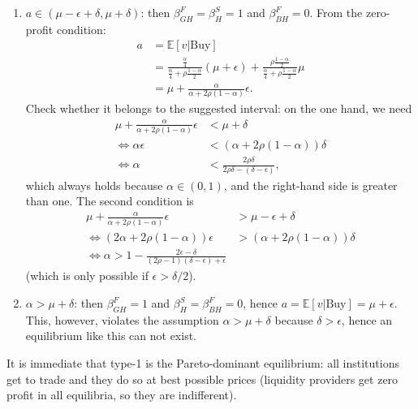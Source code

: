 \begin{solution}
\begin{enumerate}
		\item $a \in (\mu - \epsilon + \delta, \mu + \delta)$: then $\beta^F_{GH} = \beta^S_H = 1$ and $\beta^F_{BH} = 0$. From the zero-profit condition:
		\begin{align*}
			a &= \mathbb{E}[v | \text{Buy}]
			\\
			&= \frac{\frac{\alpha}{4}}{\frac{\alpha}{4} + \rho \frac{1-\alpha}{2}} (\mu + \epsilon) 
			+ \frac{\rho \frac{1-\alpha}{2}}{\frac{\alpha}{4} + \rho \frac{1-\alpha}{2}} \mu
			\\
			&= \mu + \frac{\alpha}{\alpha + 2\rho (1-\alpha)} \epsilon.
		\end{align*}
		Check whether it belongs to the suggested interval: on the one hand, we need
		\begin{align*}
			\mu + \frac{\alpha}{\alpha + 2\rho (1-\alpha)} \epsilon &< \mu + \delta
			\\
			\iff
			\alpha \epsilon &< \left( \alpha + 2\rho (1-\alpha) \right) \delta
			\\
			\iff
			\alpha &< \frac{2\rho \delta}{2\rho \delta - (\delta - \epsilon)},
		\end{align*}
		which always holds because $\alpha \in (0,1)$, and the right-hand side is greater than one. The second condition is
		\begin{align*}
			\mu + \frac{\alpha}{\alpha + 2\rho (1-\alpha)} \epsilon &> \mu - \epsilon + \delta
			\\
			\iff
			(2\alpha + 2\rho (1-\alpha)) \epsilon &> (\alpha + 2\rho (1-\alpha)) \delta
			\\
			\iff
			\alpha > 1 - \frac{2 \epsilon - \delta}{(2\rho-1)(\delta-\epsilon) + \epsilon}
		\end{align*}
		(which is only possible if $\epsilon > \delta /2$).
		
		\item $\alpha > \mu + \delta$: then $\beta^F_{GH} = 1$ and $\beta^S_H = \beta^F_{BH} = 0$, hence $a = \mathbb{E}[v | \text{Buy}] = \mu + \epsilon$. This, however, violates the assumption $\alpha > \mu + \delta$ because $\delta > \epsilon$, hence an equilibrium like this can not exist.
	\end{enumerate}

	It is immediate that type-1 is the Pareto-dominant equilibrium: all institutions get to trade and they do so at best possible prices (liquidity providers get zero profit in all equilibria, so they are indifferent).
	
	

\end{solution}
